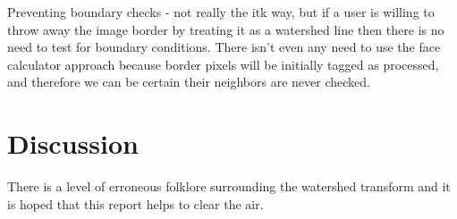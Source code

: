 \documentclass{InsightArticle}
\begin{document}
Preventing boundary checks - not really the itk way, but if a user is
willing to throw away the image border by treating it as a watershed
line then there is no need to test for boundary conditions. There
isn't even any need to use the face calculator approach because border
pixels will be initially tagged as processed, and therefore we can be
certain their neighbors are never checked.

\section{Discussion}
There is a level of erroneous folklore surrounding the watershed
transform and it is hoped that this report helps to clear the air.


\appendix





\nocite{ITKSoftwareGuide}
\end{document}

